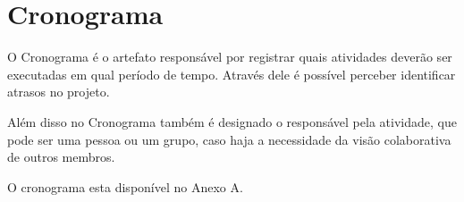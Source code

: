 \section{Cronograma}
O Cronograma é o artefato responsável por registrar quais atividades deverão ser executadas em qual período de tempo. Através dele é possível perceber identificar atrasos no projeto.

Além disso no Cronograma também é designado o responsável pela atividade, que pode ser uma pessoa ou um grupo, caso haja a necessidade da visão colaborativa de outros membros.

O cronograma esta disponível no Anexo A.



